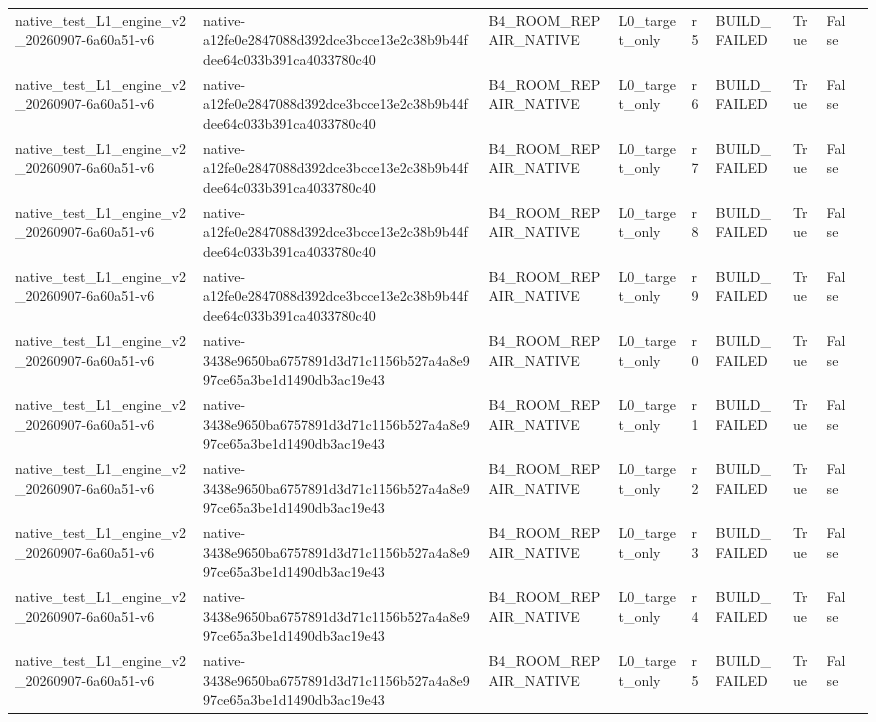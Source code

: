 \begin{tabular}{lllllllll}
native\_test\_L1\_engine\_v2\_20260907-6a60a51-v6 & native-a12fe0e2847088d392dce3bcce13e2c38b9b44fdee64c033b391ca4033780c40 & B4\_ROOM\_REPAIR\_NATIVE & L0\_target\_only & r5 & BUILD\_FAILED & True & False &  \\
native\_test\_L1\_engine\_v2\_20260907-6a60a51-v6 & native-a12fe0e2847088d392dce3bcce13e2c38b9b44fdee64c033b391ca4033780c40 & B4\_ROOM\_REPAIR\_NATIVE & L0\_target\_only & r6 & BUILD\_FAILED & True & False &  \\
native\_test\_L1\_engine\_v2\_20260907-6a60a51-v6 & native-a12fe0e2847088d392dce3bcce13e2c38b9b44fdee64c033b391ca4033780c40 & B4\_ROOM\_REPAIR\_NATIVE & L0\_target\_only & r7 & BUILD\_FAILED & True & False &  \\
native\_test\_L1\_engine\_v2\_20260907-6a60a51-v6 & native-a12fe0e2847088d392dce3bcce13e2c38b9b44fdee64c033b391ca4033780c40 & B4\_ROOM\_REPAIR\_NATIVE & L0\_target\_only & r8 & BUILD\_FAILED & True & False &  \\
native\_test\_L1\_engine\_v2\_20260907-6a60a51-v6 & native-a12fe0e2847088d392dce3bcce13e2c38b9b44fdee64c033b391ca4033780c40 & B4\_ROOM\_REPAIR\_NATIVE & L0\_target\_only & r9 & BUILD\_FAILED & True & False &  \\
native\_test\_L1\_engine\_v2\_20260907-6a60a51-v6 & native-3438e9650ba6757891d3d71c1156b527a4a8e997ce65a3be1d1490db3ac19e43 & B4\_ROOM\_REPAIR\_NATIVE & L0\_target\_only & r0 & BUILD\_FAILED & True & False &  \\
native\_test\_L1\_engine\_v2\_20260907-6a60a51-v6 & native-3438e9650ba6757891d3d71c1156b527a4a8e997ce65a3be1d1490db3ac19e43 & B4\_ROOM\_REPAIR\_NATIVE & L0\_target\_only & r1 & BUILD\_FAILED & True & False &  \\
native\_test\_L1\_engine\_v2\_20260907-6a60a51-v6 & native-3438e9650ba6757891d3d71c1156b527a4a8e997ce65a3be1d1490db3ac19e43 & B4\_ROOM\_REPAIR\_NATIVE & L0\_target\_only & r2 & BUILD\_FAILED & True & False &  \\
native\_test\_L1\_engine\_v2\_20260907-6a60a51-v6 & native-3438e9650ba6757891d3d71c1156b527a4a8e997ce65a3be1d1490db3ac19e43 & B4\_ROOM\_REPAIR\_NATIVE & L0\_target\_only & r3 & BUILD\_FAILED & True & False &  \\
native\_test\_L1\_engine\_v2\_20260907-6a60a51-v6 & native-3438e9650ba6757891d3d71c1156b527a4a8e997ce65a3be1d1490db3ac19e43 & B4\_ROOM\_REPAIR\_NATIVE & L0\_target\_only & r4 & BUILD\_FAILED & True & False &  \\
native\_test\_L1\_engine\_v2\_20260907-6a60a51-v6 & native-3438e9650ba6757891d3d71c1156b527a4a8e997ce65a3be1d1490db3ac19e43 & B4\_ROOM\_REPAIR\_NATIVE & L0\_target\_only & r5 & BUILD\_FAILED & True & False &  \\

\end{tabular}
